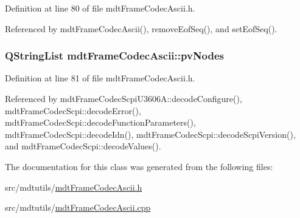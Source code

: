 Definition at line 80 of file mdt\-Frame\-Codec\-Ascii.\-h.



Referenced by mdt\-Frame\-Codec\-Ascii(), remove\-Eof\-Seq(), and set\-Eof\-Seq().

\hypertarget{classmdt_frame_codec_ascii_aa47c85e69bc7609e21efe89de0b8308d}{
\subsubsection[{pv\-Nodes}]{\setlength{\rightskip}{0pt plus 5cm}Q\-String\-List mdt\-Frame\-Codec\-Ascii\-::pv\-Nodes\hspace{0.3cm}{\ttfamily [protected]}}}\label{classmdt_frame_codec_ascii_aa47c85e69bc7609e21efe89de0b8308d}


Definition at line 81 of file mdt\-Frame\-Codec\-Ascii.\-h.



Referenced by mdt\-Frame\-Codec\-Scpi\-U3606\-A\-::decode\-Configure(), mdt\-Frame\-Codec\-Scpi\-::decode\-Error(), mdt\-Frame\-Codec\-Scpi\-::decode\-Function\-Parameters(), mdt\-Frame\-Codec\-Scpi\-::decode\-Idn(), mdt\-Frame\-Codec\-Scpi\-::decode\-Scpi\-Version(), and mdt\-Frame\-Codec\-Scpi\-::decode\-Values().



The documentation for this class was generated from the following files\-:\begin{DoxyCompactItemize}
\item 
src/mdtutils/\hyperlink{mdt_frame_codec_ascii_8h}{mdt\-Frame\-Codec\-Ascii.\-h}\item 
src/mdtutils/\hyperlink{mdt_frame_codec_ascii_8cpp}{mdt\-Frame\-Codec\-Ascii.\-cpp}\end{DoxyCompactItemize}
